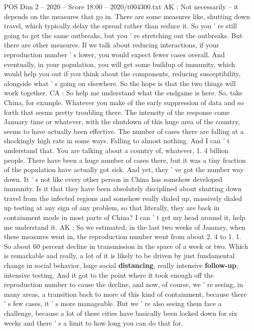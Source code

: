 \begin{textsample}{POS Dim 2 – 2020 – Score 18.00 – 2020/t004300.txt}
AK : Not necessarily -- it depends on the measures that go in.
There are some measures like, shutting down travel, which typically delay the spread rather than reduce it.
So you ' re still going to get the same outbreaks, but you ' re stretching out the outbreaks.
But there are other measures.
If we talk about reducing interactions, if your reproduction number ' s lower, you would expect fewer cases overall.
And eventually, in your population, you will get some buildup of immunity, which would help you out if you think about the components, reducing susceptibility, alongside what ' s going on elsewhere.
So the hope is that the two things will work together.
CA : So help me understand what the endgame is here.
So, take China, for example.
Whatever you make of the early suppression of data and so forth that seems pretty troubling there.
The intensity of the response come January time or whatever, with the shutdown of this huge area of the country, seems to have actually been effective.
The number of cases there are falling at a shockingly high rate in some ways.
Falling to almost nothing.
And I can ' t understand that.
You are talking about a country of, whatever, 1. 4 billion people.
There have been a huge number of cases there, but it was a tiny fraction of the population have actually got sick.
And yet, they ' ve got the number way down.
It ' s not like every other person in China has somehow developed immunity.
Is it that they have been absolutely disciplined about shutting down travel from the infected regions and somehow really dialed up, massively dialed up testing at any sign of any problem, so that literally, they are back in containment mode in most parts of China?
I can ' t get my head around it, help me understand it.
AK : So we estimated, in the last two weeks of January, when these measures went in, the reproduction number went from about 2. 4 to 1. 1.
So about 60 percent decline in transmission in the space of a week or two.
Which is remarkable and really, a lot of it is likely to be driven by just fundamental change in social behavior, huge social \textbf{distancing}, really intensive \textbf{follow-up}, intensive testing.
And it got to the point where it took enough off the reproduction number to cause the decline, and now, of course, we ' re seeing, in many areas, a transition back to more of this kind of containment, because there ' s few cases, it ' s more manageable.
But we ' re also seeing them face a challenge, because a lot of these cities have basically been locked down for six weeks and there ' s a limit to how long you can do that for.

\end{textsample}
